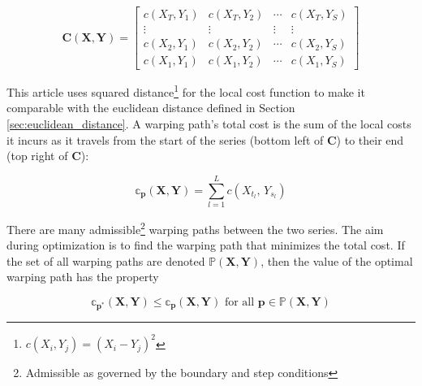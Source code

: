 \begin{equation}
    \mathbf{C}(\boldsymbol{X}, \boldsymbol{Y}) = \left[ 
        \begin{array}{cccc}
            c(X_{T}, Y_{1}) & c(X_{T}, Y_{2}) & \cdots & c(X_{T}, Y_{S}) \\ 
            \vdots          & \vdots          & \vdots & \vdots          \\
            c(X_{2}, Y_{1}) & c(X_{2}, Y_{2}) & \cdots & c(X_{2}, Y_{S}) \\ 
            c(X_{1}, Y_{1}) & c(X_{1}, Y_{2}) & \cdots & c(X_{1}, Y_{S})
    \end{array}\right]
\end{equation}

This article uses squared distance\footnote{$c(X_{i}, Y_{j}) = (X_{i} - Y_{j})^2$} for the local cost function to make it comparable with the euclidean distance defined in Section \ref{sec:euclidean_distance}. A warping path's total cost is the sum of the local costs it incurs as it travels from the start of the series (bottom left of $\boldsymbol{C}$) to their end (top right of $\boldsymbol{C}$):

\begin{equation} \label{eq:dtw_cost_matrix_definition}
    \mathbb{c}_{\boldsymbol{p}}(\boldsymbol{X}, \boldsymbol{Y}) = \sum^{L}_{l=1} c(X_{t_{l}},\, Y_{s_{l}})
\end{equation}

There are many admissible\footnote{Admissible as governed by the boundary and step conditions} warping paths between the two series. The aim during optimization is to find the warping path that minimizes the total cost. If the set of all warping paths are denoted $\mathbb{P}(\boldsymbol{X}, \boldsymbol{Y})$, then the value of the optimal warping path has the property

\begin{equation}
    \mathbb{c}_{\boldsymbol{p}^{*}}(\boldsymbol{X}, \boldsymbol{Y}) \le \mathbb{c}_{\boldsymbol{p}}(\boldsymbol{X}, \boldsymbol{Y}) \,\, \textrm{for all} \,\, \boldsymbol{p} \in \mathbb{P}(\boldsymbol{X}, \boldsymbol{Y})
\end{equation}

